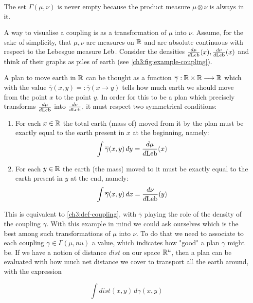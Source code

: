 \begin{remark}
	The set $\Gamma(\mu,\nu)$ is never empty because the product measure $\mu \otimes \nu$ is always in it.
\end{remark}

A way to visualise a coupling is as a transformation of $\mu$ into $\nu$.
Assume, for the sake of simplicity, that $\mu,\nu$ are measures on $\mathbb{R}$ and are absolute continuous with respect to the Lebesgue measure $\text{Leb}$.
Consider the densities $\frac{d\mu}{d\text{Leb}}(x), \frac{d\nu}{d\text{Leb}}(x)$ and think of their graphs as piles of earth (see \ref{ch3:fig:example-coupling}).

A plan to move earth in $\mathbb{R}$ can be thought as a function $\overline{\gamma}: \mathbb{R} \times \mathbb{R} \longrightarrow \mathbb{R} $ which with the value $\overline{\gamma}(x,y)=: \overline{\gamma}(x\rightarrow y)$ tells how much earth we should move from the point $x$ to the point $y$.
In order for this to be a plan which precisely transforms $\frac{d\mu}{d\text{Leb}}$ into $\frac{d\nu}{d\text{Leb}}$, it must respect two symmetrical conditions:
\begin{enumerate}
	\item For each $x\in\mathbb{R}$ the total earth (mass of) moved from it by the plan must be exactly equal to the earth present in $x$ at the beginning, namely:
	\begin{equation}
		\int \overline{\gamma}(x,y) \,dy = \frac{d\mu}{d\text{Leb}}(x)
	\end{equation}
	\item For each $y\in\mathbb{R}$ the earth (the mass) moved to it must be exactly equal to the earth present in $y$ at the end, namely:
	\begin{equation}
		\int \overline{\gamma}(x,y) \,dx = \frac{d\nu}{d\text{Leb}}(y)
	\end{equation}
\end{enumerate}

This is equivalent to \ref{ch3:def-coupling}, with $\overline{\gamma}$ playing the role of the density of the coupling $\gamma$.
With this example in mind we could ask ourselves which is the best among such transformations of $\mu$ into $\nu$.
To do that we need to associate to each coupling $\gamma \in \Gamma(\mu,nu)$ a value, which indicates how "good" a plan $\gamma$ might be.
If we have a notion of distance $dist$ on our space $\mathbb{R}^u$, then a plan can be evaluated with how much net distance we cover to transport all the earth around, \ie with the expression

\begin{equation}
	\int dist(x,y) \,d\gamma(x,y)
\end{equation}

